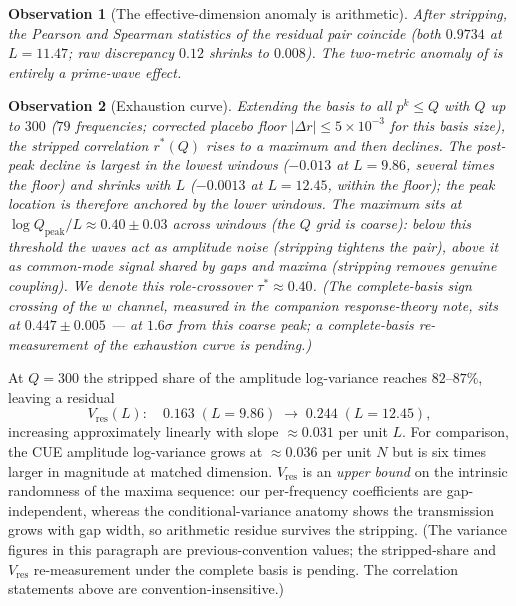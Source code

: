 \documentclass[12pt]{amsart}
\newtheorem{observation}{Observation}
\begin{document}
\begin{observation}[The effective-dimension anomaly is arithmetic]
After stripping, the Pearson and Spearman statistics of the residual pair
coincide (both $0.9734$ at $L = 11.47$; raw discrepancy $0.12$ shrinks to
$0.008$). The two-metric anomaly of \cite{companion} is entirely a
prime-wave effect.
\end{observation}

\begin{observation}[Exhaustion curve]
Extending the basis to all $p^k \le Q$ with $Q$ up to $300$ ($79$
frequencies; corrected placebo floor $|\Delta r| \le 5\times10^{-3}$ for
this basis size), the stripped correlation
$r^*(Q)$ rises to a maximum and then \emph{declines}. The post-peak
decline is largest in the lowest windows ($-0.013$ at $L = 9.86$, several
times the floor) and shrinks with $L$ ($-0.0013$ at $L = 12.45$, within
the floor); the peak location is therefore anchored by the lower windows. The maximum sits at
$\log Q_{\mathrm{peak}} / L \approx 0.40 \pm 0.03$ across windows (the
$Q$ grid is coarse): below this threshold the waves act as amplitude
noise (stripping tightens the pair), above it as common-mode signal
shared by gaps and maxima (stripping removes genuine coupling). We denote
this role-crossover $\tau^* \approx 0.40$. (The complete-basis sign
crossing of the $w$ channel, measured in the companion response-theory
note, sits at $0.447 \pm 0.005$ --- at $1.6\sigma$ from this coarse
peak; a complete-basis re-measurement of the exhaustion curve is
pending.)
\end{observation}

At $Q = 300$ the stripped share of the amplitude log-variance reaches
$82$--$87\%$, leaving a residual
\[
V_{\mathrm{res}}(L): \quad 0.163 \;(L{=}9.86) \;\to\; 0.244 \;(L{=}12.45),
\]
increasing approximately linearly with slope $\approx 0.031$ per unit
$L$. For comparison, the CUE amplitude log-variance grows at
$\approx 0.036$ per unit $N$ but is six times larger in magnitude at
matched dimension. $V_{\mathrm{res}}$ is an \emph{upper bound} on the
intrinsic randomness of the maxima sequence: our per-frequency
coefficients are gap-independent, whereas the conditional-variance
anatomy shows the transmission grows with gap width, so arithmetic
residue survives the stripping. (The variance figures in this paragraph
are previous-convention values; the stripped-share and
$V_{\mathrm{res}}$ re-measurement under the complete basis is pending.
The correlation statements above are convention-insensitive.)
\end{document}
